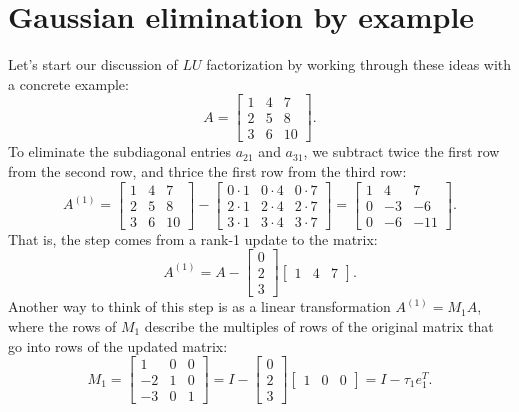 \documentclass[12pt, leqno]{article} %
\begin{document}
\section{Gaussian elimination by example}

Let's start our discussion of $LU$ factorization by working through
these ideas with a concrete example:
\[
  A =
  \begin{bmatrix}
    1 & 4 & 7 \\
    2 & 5 & 8 \\
    3 & 6 & 10
  \end{bmatrix}.
\]
To eliminate the subdiagonal entries $a_{21}$ and $a_{31}$, we
subtract twice the first row from the second row, and thrice the
first row from the third row:
\[
  A^{(1)} =
  \begin{bmatrix}
    1 & 4 & 7 \\
    2 & 5 & 8 \\
    3 & 6 & 10
  \end{bmatrix} -
  \begin{bmatrix}
    0 \cdot 1 & 0 \cdot 4 & 0 \cdot 7 \\
    2 \cdot 1 & 2 \cdot 4 & 2 \cdot 7 \\
    3 \cdot 1 & 3 \cdot 4 & 3 \cdot 7
  \end{bmatrix}
  =
  \begin{bmatrix}
    1 &  4 &  7 \\
    0 & -3 & -6 \\
    0 & -6 & -11
  \end{bmatrix}.
\]
That is, the step comes from a rank-1 update to the matrix:
\[
  A^{(1)} =
  A -
  \begin{bmatrix} 0 \\ 2 \\ 3 \end{bmatrix}
  \begin{bmatrix} 1 & 4 & 7 \end{bmatrix}.
\]
Another way to think of this step is as a linear transformation
$A^{(1)} = M_1 A$, where the rows of $M_1$ describe the multiples
of rows of the original matrix that go into rows of the updated matrix:
\[
  M_1 = \begin{bmatrix} 1 & 0 & 0 \\ -2 & 1 & 0 \\ -3 & 0 & 1 \end{bmatrix}
      = I - \begin{bmatrix} 0 \\ 2 \\ 3 \end{bmatrix}
            \begin{bmatrix} 1 & 0 & 0 \end{bmatrix}
      = I - \tau_1 e_1^T.
\]
\end{document}
